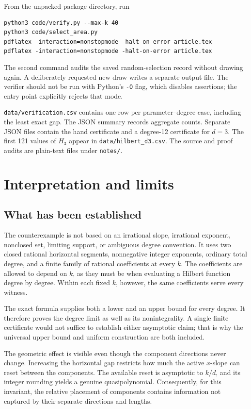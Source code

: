 \documentclass[11pt,a4paper]{article}
\numberwithin{equation}{section}
\theoremstyle{definition}
\theoremstyle{remark}
\begin{document}
From the unpacked package directory, run
\begin{verbatim}
python3 code/verify.py --max-k 40
python3 code/select_area.py
pdflatex -interaction=nonstopmode -halt-on-error article.tex
pdflatex -interaction=nonstopmode -halt-on-error article.tex
\end{verbatim}
The second command audits the saved random-selection record without drawing
again. A deliberately requested new draw writes a separate output file.
The verifier should not be run with Python's \texttt{-O} flag, which disables
assertions; the entry point explicitly rejects that mode.

\texttt{data/verification.csv} contains one row per parameter--degree case,
including the least exact gap. The JSON summary records aggregate counts.
Separate JSON files contain the hand certificate and a degree-12 certificate
for $d=3$. The first 121 values of $H_3$ appear in
\texttt{data/hilbert\_d3.csv}. The source and proof audits are plain-text files
under \texttt{notes/}.

\section{Interpretation and limits}
\label{sec:limits}

\subsection{What has been established}

The counterexample is not based on an irrational slope, irrational exponent,
nonclosed set, limiting support, or ambiguous degree convention. It uses two
closed rational horizontal segments, nonnegative integer exponents, ordinary
total degree, and a finite family of rational coefficients at every $k$.
The coefficients are allowed to depend on $k$, as they must be when evaluating
a Hilbert function degree by degree. Within each fixed $k$, however, the same
coefficients serve every witness.

The exact formula supplies both a lower and an upper bound for every degree.
It therefore proves the degree limit as well as its nonintegrality. A single
finite certificate would not suffice to establish either asymptotic claim;
that is why the universal upper bound and uniform construction are both
included.

The geometric effect is visible even though the component directions never
change. Increasing the horizontal gap restricts how much the active
$x$-slope can reset between the components. The available reset is asymptotic
to $k/d$, and its integer rounding yields a genuine quasipolynomial.
Consequently, for this invariant, the relative placement of components
contains information not captured by their separate directions and lengths.
\end{document}
